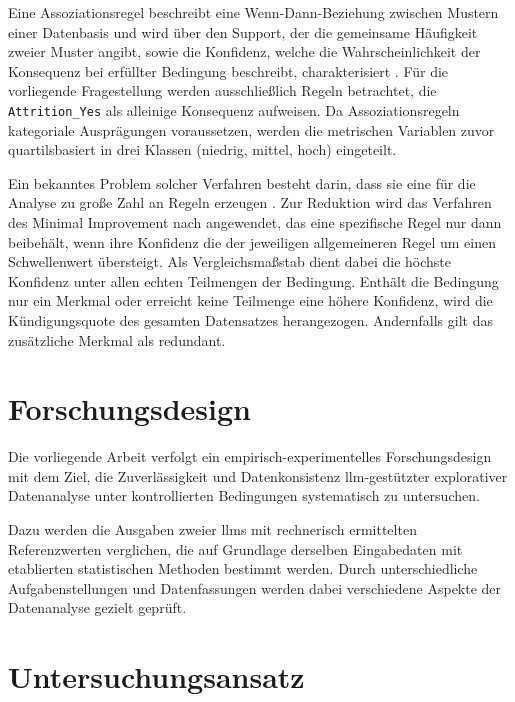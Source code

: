 Eine Assoziationsregel beschreibt eine Wenn-Dann-Beziehung zwischen Mustern einer Datenbasis und wird über den Support, der die gemeinsame Häufigkeit zweier Muster angibt, sowie die Konfidenz, welche die Wahrscheinlichkeit der Konsequenz bei erfüllter Bedingung beschreibt, charakterisiert \parencite[206]{hammesfahr_identifikation_2021}. Für die vorliegende Fragestellung werden ausschließlich Regeln betrachtet, die \texttt{Attrition\_Yes} als alleinige Konsequenz aufweisen. Da Assoziationsregeln kategoriale Ausprägungen voraussetzen, werden die metrischen Variablen zuvor quartilsbasiert in drei Klassen (niedrig, mittel, hoch) eingeteilt.

Ein bekanntes Problem solcher Verfahren besteht darin, dass sie eine für die Analyse zu große Zahl an Regeln erzeugen \parencite[202]{hammesfahr_identifikation_2021}. Zur Reduktion wird das Verfahren des Minimal Improvement nach \textcite[207]{hammesfahr_identifikation_2021} angewendet, das eine spezifische Regel nur dann beibehält, wenn ihre Konfidenz die der jeweiligen allgemeineren Regel um einen Schwellenwert übersteigt. Als Vergleichsmaßstab dient dabei die höchste Konfidenz unter allen echten Teilmengen der Bedingung. Enthält die Bedingung nur ein Merkmal oder erreicht keine Teilmenge eine höhere Konfidenz, wird die Kündigungsquote des gesamten Datensatzes herangezogen. Andernfalls gilt das zusätzliche Merkmal als redundant.

\section{Forschungsdesign}
\label{sec:forschungsdesign}

Die vorliegende Arbeit verfolgt ein empirisch-experimentelles Forschungsdesign mit dem Ziel, die Zuverlässigkeit und 
Datenkonsistenz \gls{llm}-gestützter explorativer Datenanalyse unter kontrollierten Bedingungen systematisch zu untersuchen.

Dazu werden die Ausgaben zweier \glspl{llm} mit rechnerisch ermittelten Referenzwerten verglichen, die auf Grundlage derselben Eingabedaten mit etablierten statistischen Methoden bestimmt werden. Durch unterschiedliche Aufgabenstellungen und Datenfassungen werden dabei verschiedene Aspekte der Datenanalyse gezielt geprüft.

\section{Untersuchungsansatz}

